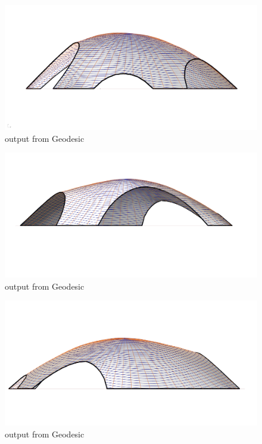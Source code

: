 \begin{figure}[H]
\centering
\includegraphics[width=1.0\linewidth ]{figure/Results/geoRight2.jpg}
\caption{output from Geodesic}
\end{figure}
\begin{figure}[H]
\centering
\includegraphics[width=1.0\linewidth ]{figure/Results/geofront2.jpg}
\caption{output from Geodesic}
\end{figure}
\begin{figure}[H]
\centering
\includegraphics[width=1.0\linewidth ]{figure/Results/geoBack2.jpg}
\caption{output from Geodesic}
\end{figure}


